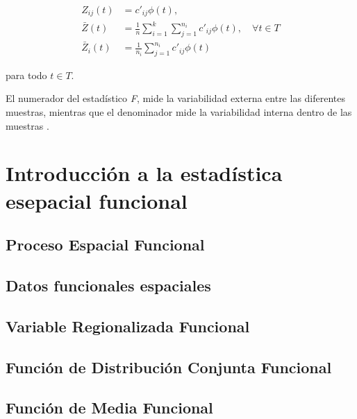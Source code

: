 \documentclass[
]{book}
\begin{document}
\begin{align}
    Z_{ij}(t)&=c'_{ij}\phi(t),\\
    \bar{Z}(t)&=\frac{1}{n}\sum_{i=1}^k\sum_{j=1}^{n_i} c'_{ij}\phi(t), \quad \forall t\in T\\
    \bar{Z}_i(t)&=\frac{1}{n_i}\sum_{j=1}^{n_i}c'_{ij}\phi(t)
\end{align}

para todo \(t\in T\).

El numerador del estadístico \textit{F}, mide la variabilidad externa entre las diferentes muestras, mientras que el denominador mide la variabilidad interna dentro de las muestras \citep{cuevas}.

\hypertarget{introducciuxf3n-a-la-estaduxedstica-esepacial-funcional}{%
\chapter{Introducción a la estadística esepacial funcional}\label{introducciuxf3n-a-la-estaduxedstica-esepacial-funcional}}

\hypertarget{proceso-espacial-funcional}{%
\section{Proceso Espacial Funcional}\label{proceso-espacial-funcional}}

\hypertarget{datos-funcionales-espaciales}{%
\section{Datos funcionales espaciales}\label{datos-funcionales-espaciales}}

\hypertarget{variable-regionalizada-funcional}{%
\section{Variable Regionalizada Funcional}\label{variable-regionalizada-funcional}}

\hypertarget{funciuxf3n-de-distribuciuxf3n-conjunta-funcional}{%
\section{Función de Distribución Conjunta Funcional}\label{funciuxf3n-de-distribuciuxf3n-conjunta-funcional}}

\hypertarget{funciuxf3n-de-media-funcional}{%
\section{Función de Media Funcional}\label{funciuxf3n-de-media-funcional}}
\end{document}
